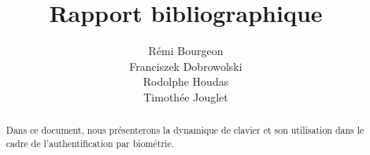 \documentclass[a4paper,11pt]{article}
\title{Rapport bibliographique}
\author{Rémi Bourgeon\\
Franciszek Dobrowolski\\
Rodolphe Houdas\\
Timothée Jouglet}
\begin{document}
\maketitle
\newpage
\tableofcontents
\newpage

\begin{abstract}
Dans ce document, nous présenterons la dynamique de clavier et son utilisation dans le cadre de l'authentification par biométrie.
\end{abstract}

\newpage

\section{}
\end{document}

